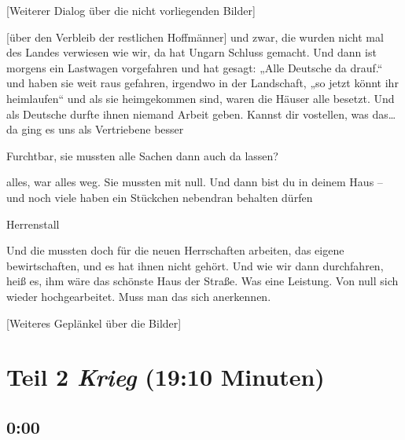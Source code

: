 \documentclass[ngerman,]{article}
\providecommand{\tightlist}{%
  \setlength{\itemsep}{0pt}\setlength{\parskip}{0pt}}
\begin{document}
\begin{multicols}{2}
{[}Weiterer Dialog über die nicht vorliegenden Bilder{]}

\begin{description}
\tightlist
\item[Käthe]
{[}über den Verbleib der restlichen Hoffmänner{]} und zwar, die wurden
nicht mal des Landes verwiesen wie wir, da hat Ungarn Schluss gemacht.
Und dann ist morgens ein Lastwagen vorgefahren und hat gesagt: „Alle
Deutsche da drauf.“ und haben sie weit raus gefahren, irgendwo in der
Landschaft, „so jetzt könnt ihr heimlaufen“ und als sie heimgekommen
sind, waren die Häuser alle besetzt. Und als Deutsche durfte ihnen
niemand Arbeit geben. Kannst dir vostellen, was das\ldots{} da ging es
uns als Vertriebene besser
\item[Ruth]
Furchtbar, sie mussten alle Sachen dann auch da lassen?
\item[Käthe]
alles, war alles weg. Sie mussten mit null. Und dann bist du in deinem
Haus – und noch viele haben ein Stückchen nebendran behalten dürfen
\item[Friedrich]
Herrenstall
\item[Käthe]
Und die mussten doch für die neuen Herrschaften arbeiten, das eigene
bewirtschaften, und es hat ihnen nicht gehört. Und wie wir dann
durchfahren, heiß es, ihm wäre das schönste Haus der Straße. Was eine
Leistung. Von null sich wieder hochgearbeitet. Muss man das sich
anerkennen.
\end{description}

{[}Weiteres Geplänkel über die Bilder{]}

\hypertarget{krieg}{%
\section{\texorpdfstring{Teil 2 \emph{Krieg} (19:10
Minuten)}{Teil 2 Krieg (19:10 Minuten)}}\label{krieg}}

\hypertarget{section-3}{%
\subsection{0:00}\label{section-3}}


\end{multicols}
\end{document}
